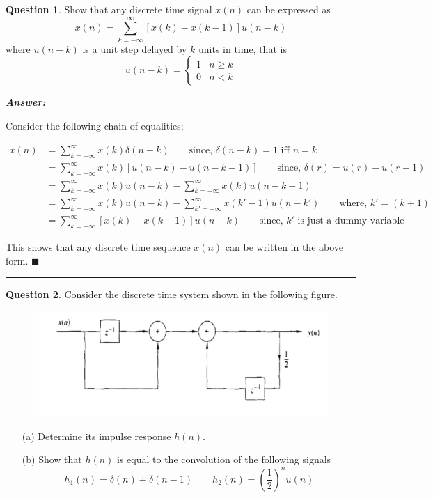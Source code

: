 \documentclass[12pt]{article}
\theoremstyle{definition}
\newtheorem{question}{Question}
\newenvironment{answer}{
    \textbf{\textit{Answer:}} \qquad
}{\hfill $\blacksquare$ \\ 

\begin{center}
    \rule{0.8\linewidth}{1.5px} 
    \vspace*{1cm}   
\end{center}
}
\begin{document}

\begin{question}
    Show that any discrete time signal $x(n)$ can be expressed as 
    $$
    x(n) = \sum_{k = -\infty}^{\infty} [x(k) - x(k-1)]u(n-k)
    $$
    where $u(n-k)$ is a unit step delayed by $k$ units in time, that is 
    $$
    u(n-k) = \begin{cases}
        1 & n \geq k\\
        0 & n < k
    \end{cases}
    $$
\end{question}

\begin{answer}
    Consider the following chain of equalities;

    \begin{align*}
        x(n)
        & = \sum_{k = -\infty}^\infty x(k) \delta(n-k) \qquad \text{since, } \delta(n-k) = 1 \text{ iff } n = k\\
        & = \sum_{k = -\infty}^\infty x(k) [u(n-k) - u(n-k-1)] \qquad \text{since, } \delta(r) = u(r) - u(r-1)\\
        & = \sum_{k = -\infty}^\infty x(k)u(n-k) - \sum_{k = -\infty}^\infty x(k)u(n-k-1)\\
        & = \sum_{k = -\infty}^\infty x(k)u(n-k) - \sum_{k' = -\infty}^\infty x(k'-1)u(n-k') \qquad \text{where, } k' = (k+1)\\
        & = \sum_{k = -\infty}^\infty [x(k) - x(k-1)]u(n-k) \qquad \text{since, } k' \text{ is just a dummy variable}
    \end{align*}

    This shows that any discrete time sequence $x(n)$ can be written in the above form.
\end{answer}


\begin{question}
    Consider the discrete time system shown in the following figure.

    \begin{figure}[H]
        \centering
        \includegraphics[width = 0.8\linewidth]{q_figure3.png}
    \end{figure}

    \begin{enumerate}
        \item[(a)] Determine its impulse response $h(n)$.
        \item[(b)] Show that $h(n)$ is equal to the convolution of the following signals 
        $$
        h_1(n) = \delta(n) + \delta(n-1) \qquad h_2(n) = \left(\frac{1}{2}\right)^n u(n)
        $$  
    \end{enumerate}
\end{question}
\end{document}

